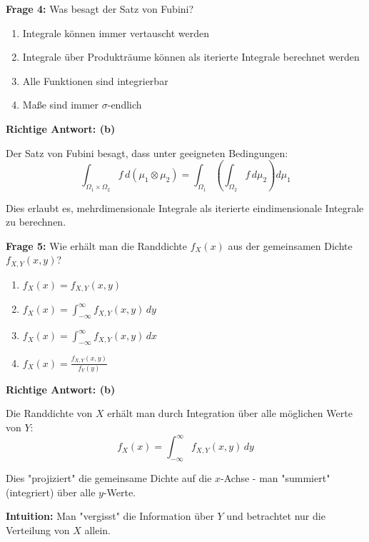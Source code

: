 \begin{multiplechoice}
\textbf{Frage 4:} Was besagt der Satz von Fubini?

\begin{enumerate}[label=(\alph*)]
    \item Integrale können immer vertauscht werden
    \item Integrale über Produkträume können als iterierte Integrale berechnet werden
    \item Alle Funktionen sind integrierbar
    \item Maße sind immer $\sigma$-endlich
\end{enumerate}

\begin{solution}
\textbf{Richtige Antwort: (b)}

Der Satz von Fubini besagt, dass unter geeigneten Bedingungen:
\[
\int_{\Omega_1 \times \Omega_2} f \, d(\mu_1 \otimes \mu_2) = \int_{\Omega_1} \left(\int_{\Omega_2} f \, d\mu_2\right) d\mu_1
\]

Dies erlaubt es, mehrdimensionale Integrale als iterierte eindimensionale Integrale zu berechnen.
\end{solution}
\end{multiplechoice}

\begin{multiplechoice}
\textbf{Frage 5:} Wie erhält man die Randdichte $f_X(x)$ aus der gemeinsamen Dichte $f_{X,Y}(x,y)$?

\begin{enumerate}[label=(\alph*)]
    \item $f_X(x) = f_{X,Y}(x,y)$
    \item $f_X(x) = \int_{-\infty}^{\infty} f_{X,Y}(x,y) \, dy$
    \item $f_X(x) = \int_{-\infty}^{\infty} f_{X,Y}(x,y) \, dx$
    \item $f_X(x) = \frac{f_{X,Y}(x,y)}{f_Y(y)}$
\end{enumerate}

\begin{solution}
\textbf{Richtige Antwort: (b)}

Die Randdichte von $X$ erhält man durch Integration über alle möglichen Werte von $Y$:
\[
f_X(x) = \int_{-\infty}^{\infty} f_{X,Y}(x,y) \, dy
\]

Dies "projiziert" die gemeinsame Dichte auf die $x$-Achse - man "summiert" (integriert) über alle $y$-Werte.

\textbf{Intuition:} Man "vergisst" die Information über $Y$ und betrachtet nur die Verteilung von $X$ allein.
\end{solution}
\end{multiplechoice}

